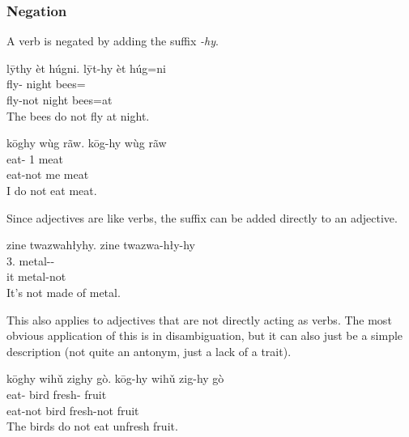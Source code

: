 \documentclass[12pt]{article}
\begin{document}
    \subsubsection*{Negation}
    A verb is negated by adding the suffix \textit{-hy}.

    \begin{exe}
        \ex
        \glt
        lȳthy èt húgni.
        \glll
        lȳt-hy èt húg=ni \\
        fly-\Neg{} night bees=\InessTwo{} \\
        fly-not night bees=at \\
        \glt
        The bees do not fly at night.
    \end{exe}

    \begin{exe}
        \ex
        \glt
        kōghy wùg rãw.
        \glll
        kōg-hy wùg rãw \\
        eat-\Neg{} 1\Sg{} meat \\
        eat-not me meat \\
        \glt
        I do not eat meat.
    \end{exe}

    Since adjectives are like verbs, the suffix can be added directly to an adjective.

    \begin{exe}
        \ex
        \glt
        zine twazwahłyhy.
        \glll
        zine twazwa-hły-hy \\
        3\Sg{}.\Inanim{} metal-\Adj{}-\Neg{} \\
        it metal-not \\
        \glt
        It's not made of metal.
    \end{exe}

    This also applies to adjectives that are not directly acting as verbs.
    The most obvious application of this is in disambiguation,
    but it can also just be a simple description (not quite an antonym, just a lack of a trait).
    \begin{exe}
        \ex
        \glt
        kōghy wihǔ zighy gò.
        \glll
        kōg-hy wihǔ zig-hy gò \\
        eat-\Neg{} bird fresh-\Neg{} fruit \\
        eat-not bird fresh-not fruit \\
        \glt
        The birds do not eat unfresh fruit.
    \end{exe}
\end{document}

